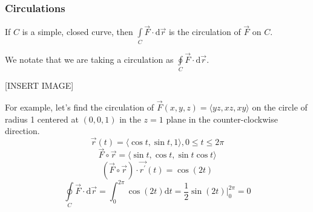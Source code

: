 \subsubsection{Circulations}
\begin{definition}
	If $C$ is a simple, closed curve, then $\int\limits_{C}{\vec{F} \cdot \mathrm{d}\vec{r}}$ is the circulation of $\vec{F}$ on $C$.
\end{definition}
\noindent
We notate that we are taking a circulation as $\oint\limits_{C}{\vec{F} \cdot \mathrm{d}\vec{r}}$.

[INSERT IMAGE]

\noindent
For example, let's find the circulation of $\vec{F}(x,y,z) = \langle yz, xz, xy \rangle$ on the circle of radius 1 centered at $(0,0,1)$ in the $z = 1$ plane in the counter-clockwise direction.
\begin{equation*}
	\vec{r}(t) = \langle \cos{t}, \sin{t}, 1 \rangle, 0 \leq t \leq 2\pi	
\end{equation*}
\begin{equation*}
	\vec{F}\circ\vec{r} = \langle \sin{t}, \cos{t}, \sin{t}\cos{t} \rangle
\end{equation*}
\begin{equation*}
	\left(\vec{F}\circ\vec{r}\right) \cdot \vec{r^\prime}(t) = \cos{(2t)}
\end{equation*}
\begin{equation*}
	\oint\limits_{C}{\vec{F}\cdot\mathrm{d}\vec{r}} = \int_{0}^{2\pi}{\cos{(2t)}\mathrm{d}t} = \frac{1}{2}\sin{(2t)}\rvert_{0}^{2\pi} = 0
\end{equation*}